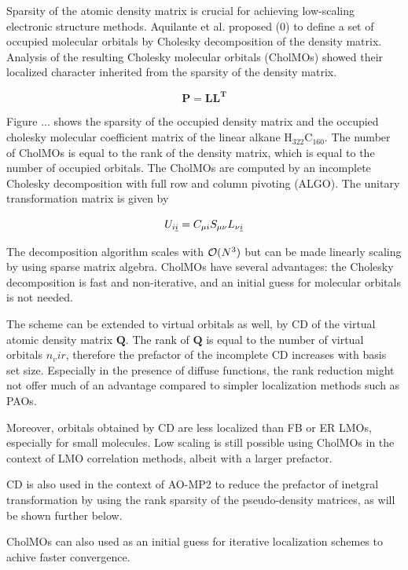Sparsity of the atomic density matrix is crucial for achieving low-scaling electronic structure methods. Aquilante et al. proposed (0) to define a set of occupied molecular orbitals by Cholesky decomposition of the density matrix. Analysis of the resulting Cholesky molecular orbitals (CholMOs) showed their localized character inherited from the sparsity of the density matrix.

\begin{equation}
\mathbf{P} = \mathbf{LL^T}
\end{equation}

Figure ... shows the sparsity of the occupied density matrix and the occupied cholesky molecular coefficient matrix of the linear alkane H$_{322}$C$_{160}$. The number of CholMOs is equal to the rank of the density matrix, which is equal to the number of occupied orbitals. The CholMOs are computed by an incomplete Cholesky decomposition with full row and column pivoting  (ALGO). The unitary transformation matrix is given by

\begin{equation}
U_{i\underline{i}} = C_{\mu i} S_{\mu \nu} L_{\nu \underline{i}}
\end{equation}

The decomposition algorithm scales with $\mathcal{O}(N^{3})$ but can be made linearly scaling by using sparse matrix algebra. CholMOs have several advantages: the Cholesky decomposition is fast and non-iterative, and an initial guess for molecular orbitals is not needed. 

The scheme can be extended to virtual orbitals as well, by CD of the virtual atomic density matrix $\mathbf{Q}$. The rank of $\mathbf{Q}$ is equal to the number of virtual orbitals $n_vir$, therefore the prefactor of the incomplete CD increases with basis set size. Especially in the presence of diffuse functions, the rank reduction might not offer much of an advantage compared to simpler localization methods such as PAOs.  

Moreover, orbitals obtained by CD are less localized than FB or ER LMOs, especially for small molecules. Low scaling is still possible using CholMOs in the context of LMO correlation methods, albeit with a larger prefactor.

CD is also used in the context of AO-MP2 to reduce the prefactor of inetgral transformation by using the rank sparsity of the pseudo-density matrices, as will be shown further below.

CholMOs can also used as an initial guess for iterative localization schemes to achive faster convergence.

